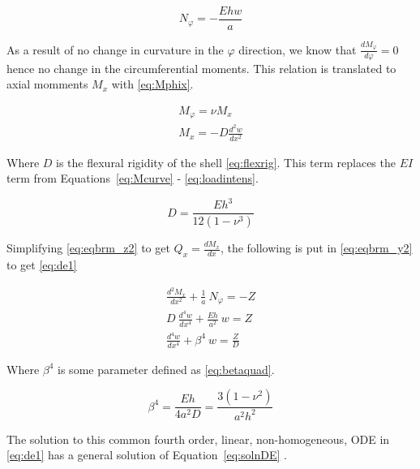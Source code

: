 \begin{equation}
	\label{eq:Nphi_simpl}
	N_\varphi = - \frac{Ehw}{a}
\end{equation}

As a result of no change in curvature in the $\varphi$ direction, we know that $\frac{dM_\varphi}{d\varphi}= 0$ hence no change in the circumferential moments. This relation is translated to axial momments $M_x$ with \ref{eq:Mphix}.

\begin{equation}
	\label{eq:Mphix}
	\begin{aligned}
	M_\varphi = \nu M_x\\
	M_x = -D \frac{d^2w}{dx^2}
	\end{aligned}
\end{equation}

Where $D$ is the flexural rigidity of the shell \ref{eq:flexrig}. This term replaces the $EI$ term from Equations~\ref{eq:Mcurve} - \ref{eq:loadintens}.


\begin{equation}
	\label{eq:flexrig}
	D = \frac{Eh^3}{12(1-\nu^3)}
\end{equation}

Simplifying \ref{eq:eqbrm_z2} to get $Q_x = \frac{dM_x}{dx}$, the following is put in \ref{eq:eqbrm_y2} to get \ref{eq:de1}

\begin{equation}
	\label{eq:de1}
	\begin{aligned}
	\frac{d^2M_x}{dx^2}+\frac{1}{a} \ N_\varphi = -Z\\
	D\ \frac{d^4w}{dx^4}+\frac{Eh}{a^2} \ w = Z\\
	\frac{d^4w}{dx^4}+\beta^4 \ w = \frac{Z}{D}
	\end{aligned}
\end{equation} 

Where $\beta^4$ is some parameter defined as \ref{eq:betaquad}.

\begin{equation}
	\label{eq:betaquad}
	\beta^4 = \frac{Eh}{4a^2D}= \frac{3(1-\nu^2)}{a^2h^2}
\end{equation}

The solution to this common fourth order, linear, non-homogeneous, ODE in \ref{eq:de1} has a general solution of Equation~\ref{eq:solnDE} \cite{timoshenko1959theory}.

